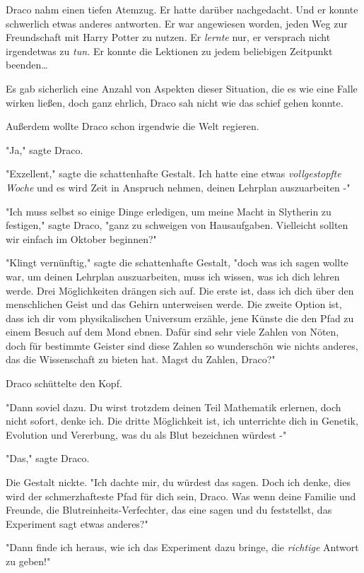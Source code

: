 {Draco nahm einen tiefen Atemzug. Er hatte darüber nachgedacht. Und er konnte schwerlich etwas anderes antworten. Er war angewiesen worden, jeden Weg zur Freundschaft mit Harry Potter zu nutzen. Er \emph{lernte} nur, er versprach nicht irgendetwas zu \emph{tun.} Er konnte die Lektionen zu jedem beliebigen Zeitpunkt beenden…

Es gab sicherlich eine Anzahl von Aspekten dieser Situation, die es wie eine Falle wirken ließen, doch ganz ehrlich, Draco sah nicht wie das schief gehen konnte.

Außerdem wollte Draco schon irgendwie die Welt regieren.

"Ja," sagte Draco.

"Exzellent," sagte die schattenhafte Gestalt. Ich hatte eine etwas \emph{vollgestopfte Woche} und es wird Zeit in Anspruch nehmen, deinen Lehrplan auszuarbeiten -"

"Ich muss selbst so einige Dinge erledigen, um meine Macht in Slytherin zu festigen," sagte Draco, "ganz zu schweigen von Hausaufgaben. Vielleicht sollten wir einfach im Oktober beginnen?"

"Klingt vernünftig," sagte die schattenhafte Gestalt, "doch was ich sagen wollte war, um deinen Lehrplan auszuarbeiten, muss ich wissen, was ich dich lehren werde. Drei Möglichkeiten drängen sich auf. Die erste ist, dass ich dich über den menschlichen Geist und das Gehirn unterweisen werde. Die zweite Option ist, dass ich dir vom physikalischen Universum erzähle, jene Künste die den Pfad zu einem Besuch auf dem Mond ebnen. Dafür sind sehr viele Zahlen von Nöten, doch für bestimmte Geister sind diese Zahlen so wunderschön wie nichts anderes, das die Wissenschaft zu bieten hat. Magst du Zahlen, Draco?"

Draco schüttelte den Kopf.

"Dann soviel dazu. Du wirst trotzdem deinen Teil Mathematik erlernen, doch nicht sofort, denke ich. Die dritte Möglichkeit ist, ich unterrichte dich in Genetik, Evolution und Vererbung, was du als Blut bezeichnen würdest -"

"Das," sagte Draco.

Die Gestalt nickte. "Ich dachte mir, du würdest das sagen. Doch ich denke, dies wird der schmerzhafteste Pfad für dich sein, Draco. Was wenn deine Familie und Freunde, die Blutreinheits-Verfechter, das eine sagen und du feststellst, das Experiment sagt etwas anderes?"

"Dann finde ich heraus, wie ich das Experiment dazu bringe, die \emph{richtige} Antwort zu geben!"

}
